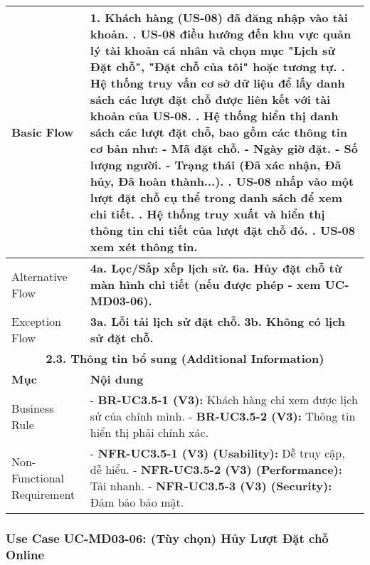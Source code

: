 \begin{longtable}{|m{4cm}|p{11cm}|}
Basic Flow & 1. Khách hàng (US-08) đã đăng nhập vào tài khoản. \newline 2. US-08 điều hướng đến khu vực quản lý tài khoản cá nhân và chọn mục "Lịch sử Đặt chỗ", "Đặt chỗ của tôi" hoặc tương tự. \newline 3. Hệ thống truy vấn cơ sở dữ liệu để lấy danh sách các lượt đặt chỗ được liên kết với tài khoản của US-08. \newline 4. Hệ thống hiển thị danh sách các lượt đặt chỗ, bao gồm các thông tin cơ bản như: \newline    - Mã đặt chỗ. \newline    - Ngày giờ đặt. \newline    - Số lượng người. \newline    - Trạng thái (Đã xác nhận, Đã hủy, Đã hoàn thành...). \newline 5. US-08 nhấp vào một lượt đặt chỗ cụ thể trong danh sách để xem chi tiết. \newline 6. Hệ thống truy xuất và hiển thị thông tin chi tiết của lượt đặt chỗ đó. \newline 7. US-08 xem xét thông tin. \\
\hline
Alternative Flow & \textbf{4a. Lọc/Sắp xếp lịch sử.} \newline \textbf{6a. Hủy đặt chỗ từ màn hình chi tiết (nếu được phép - xem UC-MD03-06).} \\
\hline
Exception Flow & \textbf{3a. Lỗi tải lịch sử đặt chỗ.} \newline \textbf{3b. Không có lịch sử đặt chỗ.} \\
\hline
\multicolumn{2}{|c|}{\textbf{2.3. Thông tin bổ sung (Additional Information)}} \\
\hline
\textbf{Mục} & \textbf{Nội dung} \\
\hline
Business Rule & - \textbf{BR-UC3.5-1 (V3):} Khách hàng chỉ xem được lịch sử của chính mình. \newline - \textbf{BR-UC3.5-2 (V3):} Thông tin hiển thị phải chính xác. \\
\hline
Non-Functional Requirement & - \textbf{NFR-UC3.5-1 (V3) (Usability):} Dễ truy cập, dễ hiểu. \newline - \textbf{NFR-UC3.5-2 (V3) (Performance):} Tải nhanh. \newline - \textbf{NFR-UC3.5-3 (V3) (Security):} Đảm bảo bảo mật. \\
\hline
\end{longtable}

\subsubsection{Use Case UC-MD03-06: (Tùy chọn) Hủy Lượt Đặt chỗ Online}

